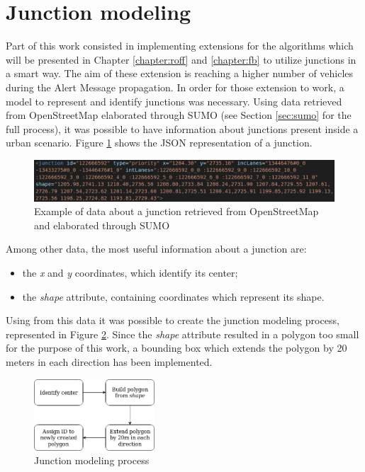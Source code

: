 	\section{Junction modeling}
		\label{sec:junction-modeling}
		Part of this work consisted in implementing extensions for the algorithms which will be presented in Chapter \ref{chapter:roff} and \ref{chapter:fb} to utilize junctions in a smart way. The aim of these extension is reaching a higher number of vehicles during the Alert Message propagation. In order for those extension to work, a model to represent and identify junctions was necessary. Using data retrieved from OpenStreetMap elaborated through SUMO (see Section \ref{sec:sumo} for the full process), it was possible to have information about junctions present inside a urban scenario. Figure \ref{fig:junction} shows the JSON representation of a junction.
		
		\begin{figure}[H]
			\centering
			\includegraphics[width=\textwidth]{immagini/junction}
			\caption{Example of data about a junction retrieved from OpenStreetMap and elaborated through SUMO}
			\label{fig:junction}
		\end{figure}
		
		Among other data, the most useful information about a junction are:
		\begin{itemize}
			\item the \textit{x} and \textit{y} coordinates, which identify its center;
			\item the \textit{shape} attribute, containing coordinates which represent its shape.
		\end{itemize}
		
		Using from this data it was possible to create the junction modeling process, represented in Figure \ref{fig:junction-process}. Since the \textit{shape} attribute resulted in a polygon too small for the purpose of this work, a bounding box which extends the polygon by 20 meters in each direction has been implemented.
		
		\begin{figure}[H]
			\centering
			\includegraphics[width=0.4\textwidth]{immagini/junction-process}
			\caption{Junction modeling process}
			\label{fig:junction-process}
		\end{figure}
	
